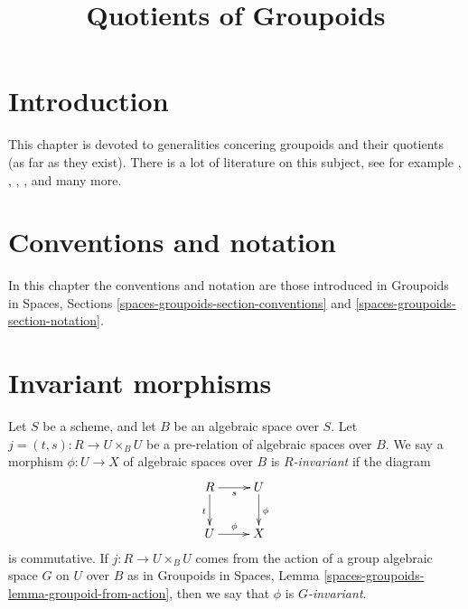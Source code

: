 

%


\title{Quotients of Groupoids}


\maketitle

\label{section-phantom}

\tableofcontents

\section{Introduction}
\label{section-introduction}

\noindent
This chapter is devoted to generalities concering groupoids and their
quotients (as far as they exist).
There is a lot of literature on this subject, see for example
\cite{GIT}, \cite{seshadri_quotients}, \cite{KollarQuotients},
\cite{K-M}, \cite{KollarFinite} and many more.





\section{Conventions and notation}
\label{section-conventions-notation}

\noindent
In this chapter the conventions and notation are those introduced in
Groupoids in Spaces, Sections \ref{spaces-groupoids-section-conventions}
and \ref{spaces-groupoids-section-notation}.


\section{Invariant morphisms}
\label{section-invariant}

\begin{definition}
\label{definition-invariant}
Let $S$ be a scheme, and let $B$ be an algebraic space over $S$.
Let $j = (t, s) : R \to U \times_B U$ be a pre-relation of algebraic
spaces over $B$. We say a morphism $\phi : U \to X$ of algebraic spaces
over $B$ is {\it $R$-invariant} if the diagram
$$
\xymatrix{
R \ar[r]_s \ar[d]_t & U \ar[d]^\phi \\
U \ar[r]^\phi & X
}
$$
is commutative. If $j : R \to U \times_B U$ comes from the action
of a group algebraic space $G$ on $U$ over $B$ as in
Groupoids in Spaces, Lemma \ref{spaces-groupoids-lemma-groupoid-from-action},
then we say that $\phi$ is {\it $G$-invariant}.
\end{definition}

